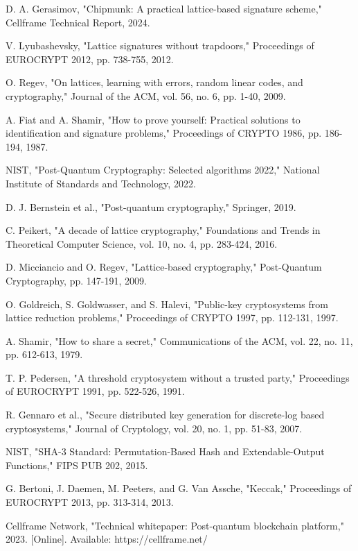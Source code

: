 \documentclass[11pt,a4paper]{article}
\begin{document}
\begin{thebibliography}{99}
D. A. Gerasimov, "Chipmunk: A practical lattice-based signature scheme," Cellframe Technical Report, 2024.

V. Lyubashevsky, "Lattice signatures without trapdoors," Proceedings of EUROCRYPT 2012, pp. 738-755, 2012.

O. Regev, "On lattices, learning with errors, random linear codes, and cryptography," Journal of the ACM, vol. 56, no. 6, pp. 1-40, 2009.

A. Fiat and A. Shamir, "How to prove yourself: Practical solutions to identification and signature problems," Proceedings of CRYPTO 1986, pp. 186-194, 1987.

NIST, "Post-Quantum Cryptography: Selected algorithms 2022," National Institute of Standards and Technology, 2022.

D. J. Bernstein et al., "Post-quantum cryptography," Springer, 2019.

C. Peikert, "A decade of lattice cryptography," Foundations and Trends in Theoretical Computer Science, vol. 10, no. 4, pp. 283-424, 2016.

D. Micciancio and O. Regev, "Lattice-based cryptography," Post-Quantum Cryptography, pp. 147-191, 2009.

O. Goldreich, S. Goldwasser, and S. Halevi, "Public-key cryptosystems from lattice reduction problems," Proceedings of CRYPTO 1997, pp. 112-131, 1997.

A. Shamir, "How to share a secret," Communications of the ACM, vol. 22, no. 11, pp. 612-613, 1979.

T. P. Pedersen, "A threshold cryptosystem without a trusted party," Proceedings of EUROCRYPT 1991, pp. 522-526, 1991.

R. Gennaro et al., "Secure distributed key generation for discrete-log based cryptosystems," Journal of Cryptology, vol. 20, no. 1, pp. 51-83, 2007.

NIST, "SHA-3 Standard: Permutation-Based Hash and Extendable-Output Functions," FIPS PUB 202, 2015.

G. Bertoni, J. Daemen, M. Peeters, and G. Van Assche, "Keccak," Proceedings of EUROCRYPT 2013, pp. 313-314, 2013.

Cellframe Network, "Technical whitepaper: Post-quantum blockchain platform," 2023. [Online]. Available: https://cellframe.net/


\end{thebibliography}
\end{document}
